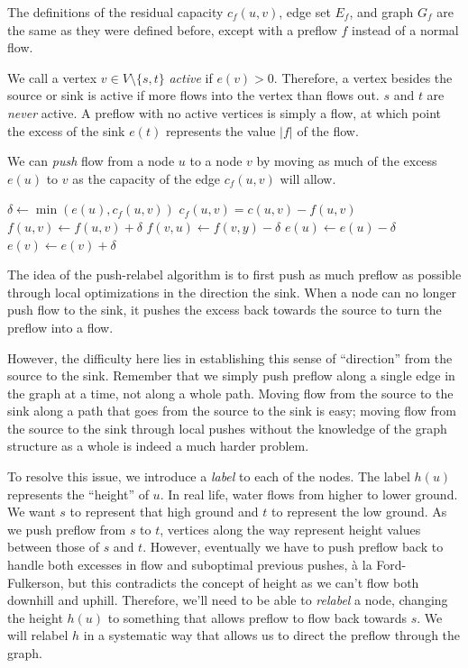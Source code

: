 The definitions of the residual capacity $c_f(u,v)$, edge set $E_f$, and graph $G_f$ are the same as they were defined before, except with a preflow $f$ instead of a normal flow.

We call a vertex $v \in V \setminus \{s, t\}$ \textit{active} if $e(v) > 0$. Therefore, a vertex besides the source or sink is active if more flows into the vertex than flows out. $s$ and $t$ are \textit{never} active. A preflow with no active vertices is simply a flow, at which point the excess of the sink $e(t)$ represents the value $|f|$ of the flow.

We can \textit{push} flow from a node $u$ to a node $v$ by moving as much of the excess $e(u)$ to $v$ as the capacity of the edge $c_f(u,v)$ will allow.

\noindent \begin{minipage}{\textwidth}
\begin{algorithmic}
	\State $\delta \gets \min(e(u), c_f(u,v))$
	\Comment $c_f(u,v) = c(u,v) - f(u,v)$
	\State $f(u,v) \gets f(u,v) + \delta$
	\State $f(v,u) \gets f(v,y) - \delta$
	\State $e(u) \gets e(u) - \delta$
	\State $e(v) \gets e(v) + \delta$
\EndFunction
\end{algorithmic}
\end{minipage}

The idea of the push-relabel algorithm is to first push as much preflow as possible through local optimizations in the direction the sink. When a node can no longer push flow to the sink, it pushes the excess back towards the source to turn the preflow into a flow.

However, the difficulty here lies in establishing this sense of ``direction'' from the source to the sink. Remember that we simply push preflow along a single edge in the graph at a time, not along a whole path. Moving flow from the source to the sink along a path that goes from the source to the sink is easy; moving flow from the source to the sink through local pushes without the knowledge of the graph structure as a whole is indeed a much harder problem.

To resolve this issue, we introduce a \textit{label} to each of the nodes. The label $h(u)$ represents the ``height'' of $u$. In real life, water flows from higher to lower ground. We want $s$ to represent that high ground and $t$ to represent the low ground. As we push preflow from $s$ to $t$, vertices along the way represent height values between those of $s$ and $t$. However, eventually we have to push preflow back to handle both excesses in flow and suboptimal previous pushes, \`{a} la Ford-Fulkerson, but this contradicts the concept of height as we can't flow both downhill and uphill. Therefore, we'll need to be able to \textit{relabel} a node, changing the height $h(u)$ to something that allows preflow to flow back towards $s$. We will relabel $h$ in a systematic way that allows us to direct the preflow through the graph.

